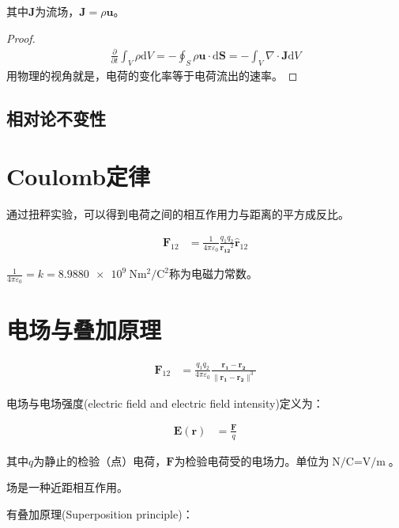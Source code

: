 \documentclass[12pt,onecolumn,a4paper]{book}
\numberwithin{table}{subsection}
\numberwithin{equation}{subsection}
\begin{document}
其中$\mathbf{J}$为流场，$\mathbf{J} = \rho \mathbf{u}$。

\begin{proof}
    \begin{align}
        \frac{\partial}{\partial t} \int_{V} \rho \mathrm{d} V = - \oint_{S} \rho \mathbf{u} \cdot \mathrm{d} \mathbf{S} = - \int_{V} \nabla \cdot \mathbf{J} \mathrm{d} V
    \end{align}
    用物理的视角就是，电荷的变化率等于电荷流出的速率。
\end{proof}

\subsection{相对论不变性}

\section{Coulomb定律}

通过扭秤实验，可以得到电荷之间的相互作用力与距离的平方成反比。

\begin{align}
    \mathbf{F}_{12} & = \frac{1}{4 \pi \varepsilon_0} \frac{q_1 q_2}{\mathbf{r_{12}}^2} \hat{\mathbf{r}}_{12}
\end{align}

$\frac{1}{4 \pi \varepsilon_0}=k=\SI{8.9880e9}{\newton\meter\squared\per\coulomb\squared}$称为电磁力常数。

\section{电场与叠加原理}

\begin{align}
    \mathbf{F}_{12} & = \frac{q_1 q_2}{4 \pi \varepsilon_0} \frac{\mathbf{r_{1}}-\mathbf{r_{2}}}{\|\mathbf{r_{1}-\mathbf{r_{2}}}\|^3}
\end{align}

电场与电场强度(electric field and electric field intensity)定义为：

\begin{align}
    \mathbf{E}(\mathbf{r}) & = \frac{\mathbf{F}}{q}
\end{align}

其中$q$为静止的检验（点）电荷，$\mathbf{F}$为检验电荷受的电场力。单位为$\si{\newton\per\coulomb}= \si{\volt\per\meter}$。

场是一种近距相互作用。

有叠加原理(Superposition principle)：
\end{document}
